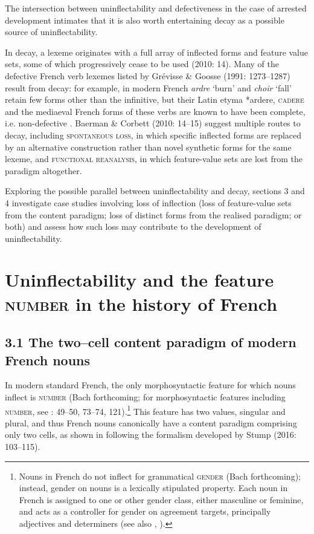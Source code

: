 \documentclass[output=paper]{langscibook}
\begin{document}
The intersection between uninflectability and defectiveness in the case of arrested development intimates that it is also worth entertaining decay as a possible source of uninflectability. 

In decay, a lexeme originates with a full array of inflected forms and feature value sets, some of which progressively cease to be used (2010: 14). Many of the defective French verb lexemes listed by Grévisse \& Goosse (1991: 1273–1287) result from decay: for example, in modern French \textit{ardre} ‘burn’ and \textit{choir} ‘fall’ retain few forms other than the infinitive, but their Latin etyma *ardere, \textsc{cadere} and the mediaeval French forms of these verbs are known to have been complete, i.e. non-defective \citep[392]{Buridant2019}. Baerman \& Corbett (2010: 14–15) suggest multiple routes to decay, including \textsc{spontaneous} \textsc{loss,} in which specific inflected forms are replaced by an alternative construction rather than novel synthetic forms for the same lexeme, and \textsc{functional} \textsc{reanalysis}, in which feature-value sets are lost from the paradigm altogether.

Exploring the possible parallel between uninflectability and decay, sections 3 and 4 investigate case studies involving loss of inflection (loss of feature-value sets from the content paradigm; loss of distinct forms from the realised paradigm; or both) and assess how such loss may contribute to the development of uninflectability. 

\section{Uninflectability and the feature \textsc{number} in the history of French}
\subsection{3.1  The two–cell content paradigm of modern French nouns}

In modern standard French, the only morphosyntactic feature for which nouns inflect is \textsc{number} (Bach forthcoming; for morphosyntactic features including \textsc{number}, see \citealt{Corbett2012}: 49–50, 73–74, 121).\footnote{Nouns in French do not inflect for grammatical \textsc{gender} (Bach forthcoming); instead, gender on nouns is a lexically stipulated property. Each noun in French is assigned to one or other gender class, either masculine or feminine, and acts as a controller for gender on agreement targets, principally adjectives and determiners (see also \citealt{Corbett2012}, \citealt{BachEsher2023}).} This feature has two values, singular and plural, and thus French nouns canonically have a content paradigm comprising only two cells, as shown in  following the formalism developed by Stump (2016: 103–115).
\end{document}
